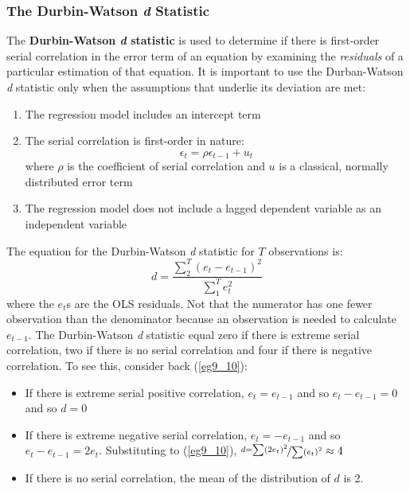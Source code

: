 \documentclass[11pt]{article}
\begin{document}
\subsubsection{The Durbin-Watson \textit{d} Statistic}
The \textbf{Durbin-Watson \textit{d} statistic} is used to determine if there is first-order serial correlation in the error term of an equation by examining the \textit{residuals} of a particular estimation of that equation. It is important to use the Durban-Watson \textit{d} statistic only when the assumptions that underlie its deviation are met:
\begin{enumerate}
\item The regression model includes an intercept term
\item The serial correlation is first-order in nature:
$$
\epsilon_t = \rho\epsilon_{t-1} + u_t
$$
where $\rho$ is the coefficient of serial correlation and $u$ is a classical, normally distributed error term
\item The regression model does not include a lagged dependent variable as an independent variable
\end{enumerate}
The equation for the Durbin-Watson \textit{d} statistic for $T$ observations is:
\begin{equation}
d= \frac{\sum^T_2 (e_t-e_{t-1})^2}{\sum^T_1 e_t^2} \label{eg9_10}
\end{equation}
where the $e_t$s are the OLS residuals. Not that the numerator has one fewer observation than the denominator because an observation is needed to calculate $e_{t-1}$. The Durbin-Watson \textit{d} statistic equal zero if there is extreme serial correlation, two if there is no serial correlation and four if there is negative correlation. To see this, consider back (\ref{eg9_10}):
\begin{itemize}
\item If there is extreme serial positive correlation, $e_t = e_{t-1}$ and so $e_t- e_{t-1}=0$ and so $d=0$
\item If there is extreme negative serial correlation, $e_t = -e_{t-1}$ and so $e_t- e_{t-1}=2e_t$. Substituting to (\ref{eg9_10}), $\nicefrac{d=\sum (2e_t)^2}{\sum (e_t)^2}\approx 4$
\item If there is no serial correlation, the mean of the distribution of $d$ is 2. 
\end{itemize}
\end{document}
